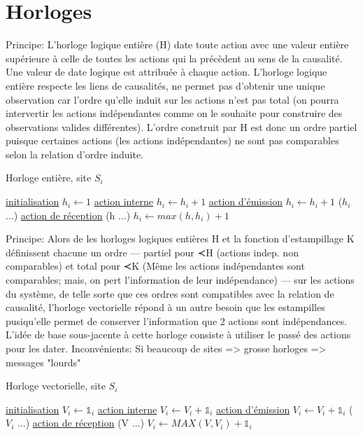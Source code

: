 \documentclass[a4paper,11pt]{article}
\begin{document}
\section{Horloges}


Principe: L’horloge logique entière (H) date toute action avec une valeur entière supérieure à celle de toutes les actions qui la précèdent au sens de la causalité. Une valeur de date logique est attribuée à chaque action.
L'horloge logique entière respecte les liens de causalités, ne permet pas d’obtenir une unique observation car l’ordre qu’elle induit sur les actions n’est pas total (on pourra intervertir les actions indépendantes comme on le souhaite pour construire des observations valides différentes). L'ordre construit par H est donc un ordre partiel puisque certaines actions (les actions indépendantes) ne sont pas comparables selon la relation d'ordre induite.

\begin{algorithm}
\DontPrintSemicolon
\SetAlgoVlined
\LinesNumbered

\caption{Horloge entière, site $S_{i}$}

\underline{initialisation} \;
  \Indp
  $h_{i} \gets 1$ \;
  \Indm
\underline{action interne} \;
  \Indp
  $h_{i} \gets h_{i} + 1$ \;
  \Indm
\underline{action d'émission} \;
  \Indp
  $h_{i} \gets h_{i} + 1$ \;
  \envoyer($h_{i}$ ...) \;
  \Indm
\underline{action de réception} \;
  \Indp
  \recevoir(h ...) \;
  $h_{i} \gets max(h, h_{i}) + 1$ \;
  \Indm
\end{algorithm}


Principe: Alors de les horloges logiques entières H et la fonction d’estampillage K définissent chacune un ordre — partiel pour ≺H (actions indep. non comparables) et total pour ≺K (Même les actions indépendantes sont comparables; mais, on pert l'information de leur indépendance) — sur les actions du système, de telle sorte que ces ordres sont compatibles avec la relation de causalité, l'horloge vectorielle répond à un autre besoin que les estampilles pusiqu'elle permet de conserver l'information que 2 actions sont indépendances. L’idée de base sous-jacente à cette horloge consiste à utiliser le passé des actions pour les dater.
Inconvénients: Si beaucoup de sites => grosse horloges => messages "lourds"

\begin{algorithm}
\DontPrintSemicolon
\SetAlgoVlined
\LinesNumbered

\caption{Horloge vectorielle, site $S_{i}$}

\underline{initialisation} \;
  \Indp
  $V_{i} \gets \mathbb{1}_{i}$\;
  \Indm
\underline{action interne} \;
  \Indp
  $V_{i} \gets V_{i} + \mathbb{1}_{i}$\;
  \Indm
\underline{action d'émission} \;
  \Indp
  $V_{i} \gets V_{i} + \mathbb{1}_{i}$\;
  \envoyer($V_{i}$ ...) \;
  \Indm
\underline{action de réception} \;
  \Indp
  \recevoir(V ...) \;
  $V_{i} \gets MAX(V, V_{i}) + \mathbb{1}_{i}$\;
  \Indm
\end{algorithm}
\end{document}

